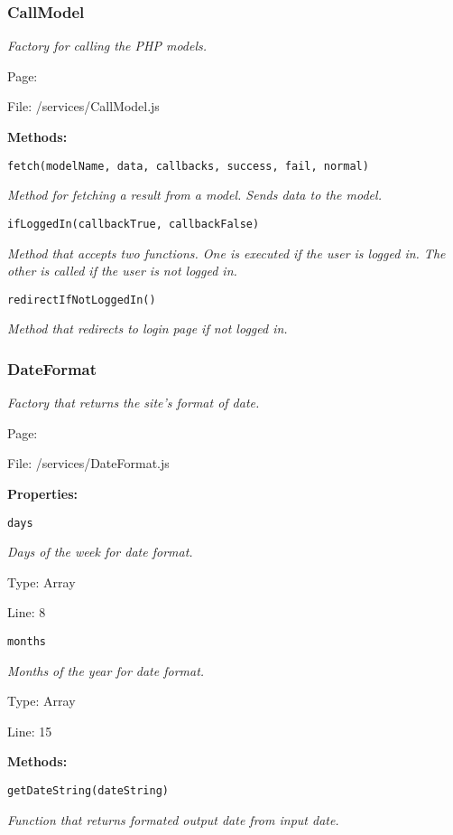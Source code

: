 \subsubsection{CallModel}\label{CallModel.js.doc}
\textit{Factory for calling the PHP models.}

Page: \pageref{CallModel.js}

File: /services/CallModel.js

\textbf{Methods:}

\texttt{fetch(modelName, data, callbacks, success, fail, normal)}

{\scriptsize
\textit{Method for fetching a result from a model.
Sends data to the model.}

}

\texttt{ifLoggedIn(callbackTrue, callbackFalse)}

{\scriptsize
\textit{Method that accepts two functions.
One is executed if the user is logged in.
The other is called if the user is not logged in.}

}

\texttt{redirectIfNotLoggedIn()}

{\scriptsize
\textit{Method that redirects to login page if not logged in.}

}

\subsubsection{DateFormat}\label{DateFormat.js.doc}
\textit{Factory that returns the site's format of date.}

Page: \pageref{DateFormat.js}

File: /services/DateFormat.js

\textbf{Properties:}

\texttt{days}

{\scriptsize
\textit{Days of the week for date format.}

Type: Array

Line: 8

}
\texttt{months}

{\scriptsize
\textit{Months of the year for date format.}

Type: Array

Line: 15

}
\textbf{Methods:}

\texttt{getDateString(dateString)}

{\scriptsize
\textit{Function that returns formated output date from input date.}

}

